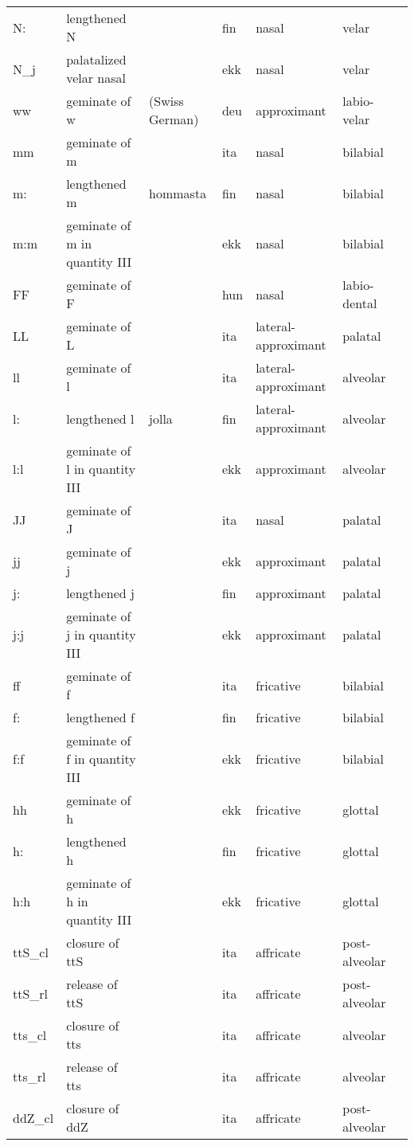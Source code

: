 \begin{longtable}{l|p{.3\linewidth}|p{.15\linewidth}|l|l|l|l}
	N:	& lengthened N	& 	& fin	& nasal	& velar	\\
	N\_j	& palatalized velar nasal	& 	& ekk	& nasal	& velar	\\
	ww	& geminate of w	& (Swiss German)	& deu	& approximant	& labio-velar	\\
	mm	& geminate of m	& 	& ita	& nasal	& bilabial	\\
	m:	& lengthened m	& hommasta	& fin	& nasal	& bilabial	\\
	m:m	& geminate of m in quantity III	& 	& ekk	& nasal	& bilabial	\\
	FF	& geminate of F	& 	& hun	& nasal	& labio-dental	\\
	LL	& geminate of L	& 	& ita	& lateral-approximant	& palatal	\\
	ll	& geminate of l	& 	& ita	& lateral-approximant	& alveolar	\\
	l:	& lengthened l	& jolla	& fin	& lateral-approximant	& alveolar	\\
	l:l	& geminate of l in quantity III	& 	& ekk	& approximant	& alveolar	\\
	JJ	& geminate of J	& 	& ita	& nasal	& palatal	\\
	jj	& geminate of j	& 	& ekk	& approximant	& palatal	\\
	j:	& lengthened j	& 	& fin	& approximant	& palatal	\\
	j:j	& geminate of j in quantity III	& 	& ekk	& approximant	& palatal	\\
	ff	& geminate of f	& 	& ita	& fricative	& bilabial	\\
	f:	& lengthened f	& 	& fin	& fricative	& bilabial	\\
	f:f	& geminate of f in quantity III	& 	& ekk	& fricative	& bilabial	\\
	hh	& geminate of h	& 	& ekk	& fricative	& glottal	\\
	h:	& lengthened h	& 	& fin	& fricative	& glottal	\\
	h:h	& geminate of h in quantity III	& 	& ekk	& fricative	& glottal	\\
	ttS\_cl	& closure of ttS	& 	& ita	& affricate	& post-alveolar	\\
	ttS\_rl	& release of ttS	& 	& ita	& affricate	& post-alveolar	\\
	tts\_cl	& closure of tts	& 	& ita	& affricate	& alveolar	\\
	tts\_rl	& release of tts	& 	& ita	& affricate	& alveolar	\\
	ddZ\_cl	& closure of ddZ	& 	& ita	& affricate	& post-alveolar	\\

\end{longtable}
